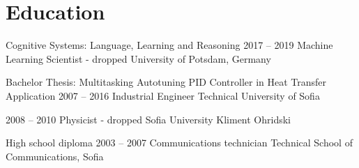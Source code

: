 \documentclass{tccv}
\begin{document}
\section{Education}
\begin{yearlist}
\item[{\footnotesize Cognitive Systems: Language, Learning and Reasoning}]
     {2017 -- 2019}
     {Machine Learning Scientist - dropped}
     {University of Potsdam, Germany}

\item[Bachelor Thesis:                 \newline
     {\footnotesize Multitasking Autotuning PID Controller in Heat Transfer Application}]
     {2007 -- 2016}
     {Industrial Engineer}
     {Technical University of Sofia}

\item[]
     {2008 -- 2010}
     {Physicist - dropped}
     {Sofia University Kliment Ohridski}

\item[High school diploma]{2003 -- 2007}
     {Communications technician}
     {Technical School of Communications, Sofia}
\end{yearlist}


\newpage
\end{document}
